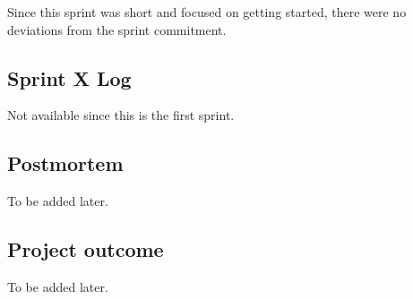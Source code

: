 \documentclass[14]{article}
\begin{document}
Since this sprint was short and focused on getting started, there were no deviations from the sprint commitment.

\subsection{Sprint X Log}
Not available since this is the first sprint.

\subsection{Postmortem}
To be added later.

\subsection{Project outcome}
To be added later.
\end{document}

